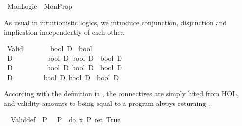 %
\begin{isabellebody}%
\def\isabellecontext{MonLogic}%
%
\isamarkuptrue%
\ MonLogic\ {\isacharequal}\ MonProp{\isacharcolon}\isamarkupfalse%
%
\label{sec:monlogic-thy}
%
\isamarkuptrue%
%
\begin{isamarkuptext}%
As usual in intuitionistic logics, we introduce conjunction,
  disjunction and implication independently of each other.
  \label{isa:logical-const}%
\end{isamarkuptext}%
\isamarkuptrue%
\isanewline
\ {\isachardoublequote}Valid{\isachardoublequote}\ \ \ \ \ \ \ {\isacharcolon}{\isacharcolon}\ {\isachardoublequote}bool\ D\ {\isasymRightarrow}\ bool{\isachardoublequote}\ \ \ \ \ \ \ \ \ \ \ \ \ \ \ {\isacharparenleft}{\isachardoublequote}{\isacharparenleft}{\isasymturnstile}\ {\isacharunderscore}{\isacharparenright}{\isachardoublequote}\ {}{}{\isacharparenright}\isanewline
\ {\isachardoublequote}{\isasymand}\isactrlsub D{\isachardoublequote}\ \ \ \ \ \ \ \ \ {\isacharcolon}{\isacharcolon}\ {\isachardoublequote}{\isacharbrackleft}bool\ D{\isacharcomma}\ bool\ D{\isacharbrackright}\ {\isasymRightarrow}\ bool\ D{\isachardoublequote}\ \ \ \ \ {\isacharparenleft}\ {}{}{\isacharparenright}\isanewline
\ {\isachardoublequote}{\isasymor}\isactrlsub D{\isachardoublequote}\ \ \ \ \ \ \ \ \ {\isacharcolon}{\isacharcolon}\ {\isachardoublequote}{\isacharbrackleft}bool\ D{\isacharcomma}\ bool\ D{\isacharbrackright}\ {\isasymRightarrow}\ bool\ D{\isachardoublequote}\ \ \ \ \ {\isacharparenleft}\ {}{}{\isacharparenright}\isanewline
\ {\isachardoublequote}{\isasymlongrightarrow}\isactrlsub D{\isachardoublequote}\ \ \ \ \ \ \ \ {\isacharcolon}{\isacharcolon}\ {\isachardoublequote}{\isacharbrackleft}bool\ D{\isacharcomma}\ bool\ D{\isacharbrackright}\ {\isasymRightarrow}\ bool\ D{\isachardoublequote}\ \ \ \ {\isacharparenleft}\ {}{}{\isacharparenright}\isamarkupfalse%
%
\begin{isamarkuptext}%
According with the definition in \cite{SchroederMossakowski:PDL}, the connectives
  are simply lifted from HOL, and validity amounts to being
  equal to a program always returning .%
\end{isamarkuptext}%
\isamarkuptrue%
\isanewline
\ \ Valid{\isacharunderscore}def{\isacharcolon}\ {\isachardoublequote}{\isasymturnstile}\ P\ {\isasymequiv}\ {\isasymDown}\ P\ {\isacharequal}\ do\ {\isacharbraceleft}x{\isasymleftarrow}{\isacharparenleft}{\isasymDown}\ P{\isacharparenright}{\isacharsemicolon}\ ret\ True{\isacharbraceright}{\isachardoublequote}\isanewline

\end{isabellebody}
